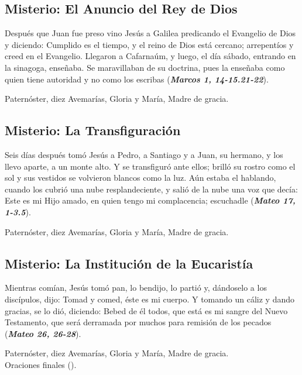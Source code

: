 \documentclass[./main.tex]{subfiles}
\newcounter{lux-counter}
\begin{document}
\subsection*{ Misterio: El Anuncio del Rey de Dios}
Después que Juan fue preso vino Jesús a Galilea predicando el Evangelio de Dios y diciendo: Cumplido es el tiempo, 
y el reino de Dios está cercano; arrepentíos y creed en el Evangelio. Llegaron a Cafarnaúm, y luego, el día sábado, 
entrando en la sinagoga, enseñaba. Se maravillaban de su doctrina, pues la enseñaba como quien tiene autoridad y 
no como los escribas (\textbf{\emph{Marcos 1, 14-15.21-22}}).

\begin{center}
      Paternóster, diez Avemarías, Gloria y María, Madre de gracia.
\end{center}

\subsection*{ Misterio: La Transfiguración}
Seis días después tomó Jesús a Pedro, a Santiago y a Juan, su hermano, y los llevo aparte, a un monte alto. 
Y se transfiguró ante ellos; brilló su rostro como el sol y sus vestidos se volvieron blancos como la luz. Aún estaba el hablando, 
cuando los cubrió una nube resplandeciente, y salió de la nube una voz que decía: Este es mi Hijo amado, 
en quien tengo mi complacencia; escuchadle (\textbf{\emph{Mateo 17, 1-3.5}}).

\begin{center}
      Paternóster, diez Avemarías, Gloria y María, Madre de gracia.
\end{center}

\subsection*{ Misterio: La Institución de la Eucaristía}
Mientras comían, Jesús tomó pan, lo bendijo, lo partió y, dándoselo a los discípulos, dijo: Tomad y comed, éste es mi cuerpo. 
Y tomando un cáliz y dando gracias, se lo dió, diciendo: Bebed de él todos, que está es mi sangre del Nuevo Testamento, 
que será derramada por muchos para remisión de los pecados (\textbf{\emph{Mateo 26, 26-28}}).

\begin{center}
      Paternóster, diez Avemarías, Gloria y María, Madre de gracia.\\
      Oraciones finales ().
\end{center}
\end{document}
